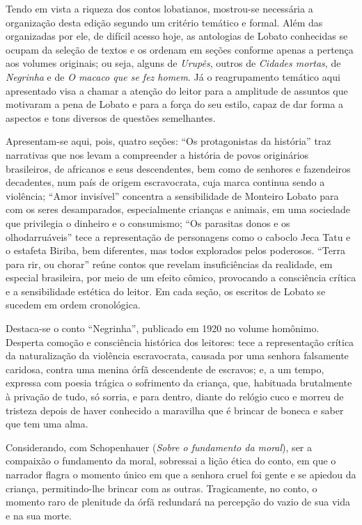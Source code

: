 Tendo em vista a riqueza dos contos lobatianos, mostrou-se necessária a
organização desta edição segundo um critério temático e formal. Além das
organizadas por ele, de difícil acesso hoje, as antologias de Lobato
conhecidas se ocupam da seleção de textos e os ordenam em seções
conforme apenas a pertença aos volumes originais; ou seja, alguns de
\emph{Urupês}, outros de \emph{Cidades mortas}, de \emph{Negrinha} e de
\emph{O macaco que se fez homem}. Já o reagrupamento temático aqui
apresentado visa a chamar a atenção do leitor para a amplitude de
assuntos que motivaram a pena de Lobato e para a força do seu estilo,
capaz de dar forma a aspectos e tons diversos de questões semelhantes.

Apresentam-se aqui, pois, quatro seções: ``Os protagonistas da
história'' traz narrativas que nos levam a compreender a história de
povos originários brasileiros, de africanos e seus descendentes, bem
como de senhores e fazendeiros decadentes, num país de origem
escravocrata, cuja marca continua sendo a violência; ``Amor invisível''
concentra a sensibilidade de Monteiro Lobato para com os seres
desamparados, especialmente crianças e animais, em uma sociedade que
privilegia o dinheiro e o consumismo; ``Os parasitas donos e os
olhodarruáveis'' tece a representação de personagens como o caboclo Jeca
Tatu e o estafeta Biriba, bem diferentes, mas todos explorados pelos
poderosos. ``Terra para rir, ou chorar'' reúne contos que revelam
insuficiências da realidade, em especial brasileira, por meio de um
efeito cômico, provocando a consciência crítica e a sensibilidade
estética do leitor. Em cada seção, os escritos de Lobato se sucedem em
ordem cronológica.

Destaca-se o conto ``Negrinha'', publicado em 1920 no volume homônimo.
Desperta comoção e consciência histórica dos leitores: tece a
representação crítica da naturalização da violência escravocrata,
causada por uma senhora falsamente caridosa, contra uma menina órfã
descendente de escravos; e, a um tempo, expressa com poesia trágica o
sofrimento da criança, que, habituada brutalmente à privação de tudo, só
sorria, e para dentro, diante do relógio cuco e morreu de tristeza
depois de haver conhecido a maravilha que é brincar de boneca e saber
que tem uma alma.

Considerando, com Schopenhauer (\emph{Sobre o fundamento da moral}), ser
a compaixão o fundamento da moral, sobressai a lição ética do conto, em
que o narrador flagra o momento único em que a senhora cruel foi gente e
se apiedou da criança, permitindo-lhe brincar com as outras.
Tragicamente, no conto, o momento raro de plenitude da órfã redundará na
percepção do vazio de sua vida e na sua morte.

